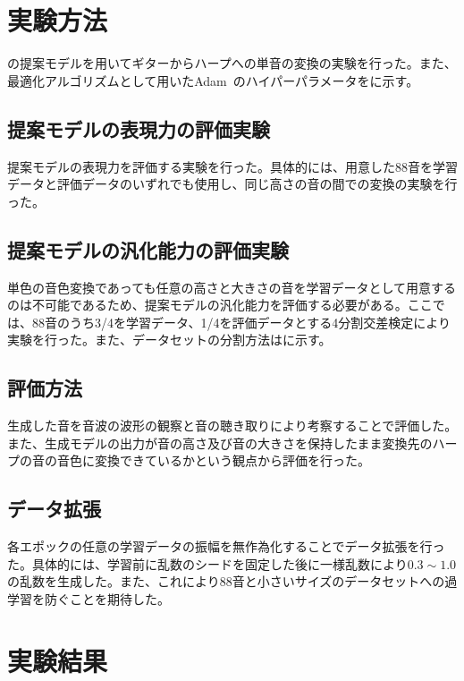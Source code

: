 \clearpage

\section{実験方法}

の提案モデルを用いてギターからハープへの単音の変換の実験を行った。また、最適化アルゴリズムとして用いたAdam~\cite{Adam}のハイパーパラメータをに示す。

\subsection{提案モデルの表現力の評価実験}

提案モデルの表現力を評価する実験を行った。具体的には、用意した88音を学習データと評価データのいずれでも使用し、同じ高さの音の間での変換の実験を行った。

\subsection{提案モデルの汎化能力の評価実験}

単色の音色変換であっても任意の高さと大きさの音を学習データとして用意するのは不可能であるため、提案モデルの汎化能力を評価する必要がある。ここでは、88音のうち3/4を学習データ、1/4を評価データとする4分割交差検定により実験を行った。また、データセットの分割方法はに示す。

\subsection{評価方法}

生成した音を音波の波形の観察と音の聴き取りにより考察することで評価した。また、生成モデルの出力が音の高さ及び音の大きさを保持したまま変換先のハープの音の音色に変換できているかという観点から評価を行った。

\subsection{データ拡張}

各エポックの任意の学習データの振幅を無作為化することでデータ拡張を行った。具体的には、学習前に乱数のシードを固定した後に一様乱数により$0.3\sim1.0$の乱数を生成した。また、これにより88音と小さいサイズのデータセットへの過学習を防ぐことを期待した。

\clearpage

\section{実験結果}
\label{sec:result}

